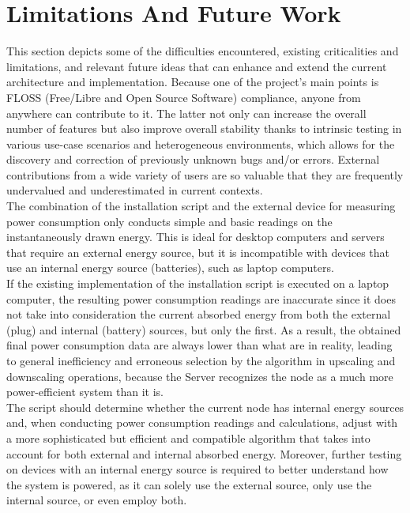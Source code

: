 \section{Limitations And Future Work}
\label{sec:conclusions_limitations_and_future_works}

This section depicts some of the difficulties encountered, existing criticalities
and limitations, and relevant future ideas that can enhance and extend the
current architecture and implementation. Because one of the project's main points
is FLOSS (Free/Libre and Open Source Software) compliance, anyone from anywhere
can contribute to it. The latter not only can increase the overall number of features
but also improve overall stability thanks to intrinsic testing in various use-case
scenarios and heterogeneous environments, which allows for the discovery and
correction of previously unknown bugs and/or errors. External contributions from
a wide variety of users are so valuable that they are frequently undervalued and
underestimated in current contexts. \\ %

The combination of the installation script and the external device for measuring
power consumption only conducts simple and basic readings on the instantaneously
drawn energy. This is ideal for desktop computers and servers that require an external
energy source, but it is incompatible with devices that use an internal energy
source (batteries), such as laptop computers. \\ %
If the existing implementation of the installation script is executed on a laptop
computer, the resulting power consumption readings are inaccurate since it does
not take into consideration the current absorbed energy from both the external (plug)
and internal (battery) sources, but only the first. As a result, the obtained final
power consumption data are always lower than what are in reality, leading to
general inefficiency and erroneous selection by the algorithm in upscaling and
downscaling operations, because the Server recognizes the node as a much more power-efficient
system than it is. \\ %
The script should determine whether the current node has internal energy sources
and, when conducting power consumption readings and calculations, adjust with a more
sophisticated but efficient and compatible algorithm that takes into account for
both external and internal absorbed energy. Moreover, further testing on devices
with an internal energy source is required to better understand how the system is
powered, as it can solely use the external source, only use the internal source,
or even employ both. \\ %

